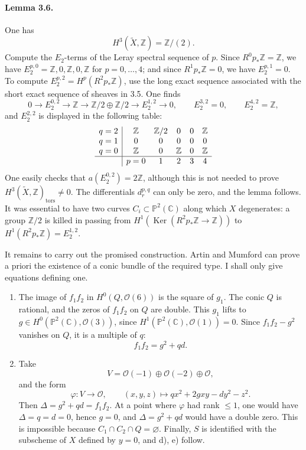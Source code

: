 \documentclass[10pt]{article}
\newcommand{\C}{\mathbb C}
\newcommand{\Pj}{\mathbb P}
\newcommand{\Z}{\mathbb Z}
\newcommand{\Ker}{\operatorname{Ker}}
\newcommand{\tors}{\operatorname{tors}}
\begin{document}
\paragraph{Lemma 3.6.} One has
\[
H^3(\widetilde X,\Z)=\Z/(2).
\]
Compute the \(E_2\)-terms of the Leray spectral sequence of \(p\). Since \(R^0p_*\Z=\Z\), we have \(E_2^{p,0}=\Z,0,\Z,0,\Z\) for \(p=0,\ldots,4\); and since \(R^1p_*\Z=0\), we have \(E_2^{p,1}=0\). To compute \(E_2^{p,2}=H^p(R^2p_*\Z)\), use the long exact sequence associated with the short exact sequence of sheaves in 3.5. One finds
\[
0\to E_2^{0,2}\to\Z\to\Z/2\oplus\Z/2\to E_2^{1,2}\to0,
\qquad E_2^{3,2}=0,
\qquad E_2^{4,2}=\Z,
\]
and \(E_2^{2,2}\) is displayed in the following table:
\[
\begin{array}{c|ccccc}
q=2&\Z&\Z/2&0&0&\Z\\
q=1&0&0&0&0&0\\
q=0&\Z&0&\Z&0&\Z\\ \hline
&p=0&1&2&3&4
\end{array}
\]
One easily checks that \(a(E_2^{0,2})=2\Z\), although this is not needed to prove \(H^3(\widetilde X,\Z)_{\tors}\ne0\). The differentials \(d_r^{p,q}\) can only be zero, and the lemma follows. It was essential to have two curves \(C_i\subset\Pj^2(\C)\) along which \(X\) degenerates: a group \(\Z/2\) is killed in passing from \(H^1(\Ker(R^2p_*\Z\to\Z))\) to \(H^1(R^2p_*\Z)=E_2^{1,2}\).

It remains to carry out the promised construction. Artin and Mumford can prove a priori the existence of a conic bundle of the required type. I shall only give equations defining one.

\begin{enumerate}[label=\arabic*)]
\item The image of \(f_1f_2\) in \(H^0(Q,\mathcal O(6))\) is the square of \(g_1\). The conic \(Q\) is rational, and the zeros of \(f_1f_2\) on \(Q\) are double. This \(g_1\) lifts to \(g\in H^0(\Pj^2(\C),\mathcal O(3))\), since \(H^1(\Pj^2(\C),\mathcal O(1))=0\). Since \(f_1f_2-g^2\) vanishes on \(Q\), it is a multiple of \(q\):
\[
f_1f_2=g^2+qd.
\]
\item Take
\[
V=\mathcal O(-1)\oplus\mathcal O(-2)\oplus\mathcal O,
\]
and the form
\[
\varphi:V\to\mathcal O,
\qquad (x,y,z)
\longmapsto qx^2+2gxy-dy^2-z^2.
\]
Then \(\Delta=g^2+qd=f_1f_2\). At a point where \(\varphi\) had rank \(\le1\), one would have \(\Delta=q=d=0\), hence \(g=0\), and \(\Delta=g^2+qd\) would have a double zero. This is impossible because \(C_1\cap C_2\cap Q=\varnothing\). Finally, \(S\) is identified with the subscheme of \(X\) defined by \(y=0\), and d), e) follow.
\end{enumerate}
\end{document}
